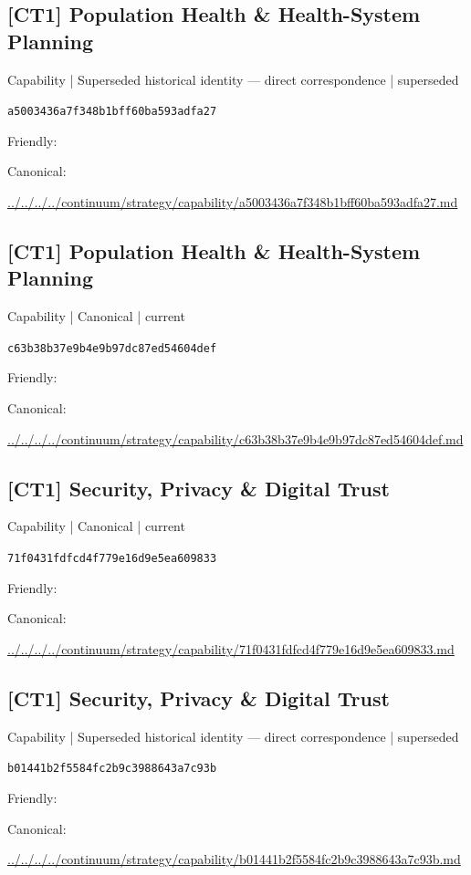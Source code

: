 \documentclass[10pt,a4paper]{article}
\begin{document}
\subsection*{[CT1] Population Health \& Health-System Planning}
{\small Capability | Superseded historical identity — direct correspondence | superseded}\par
\texttt{a5003436a7f348b1bff60ba593adfa27}\par
Friendly: \par
Canonical: \par
{\footnotesize\url{../../../../continuum/strategy/capability/a5003436a7f348b1bff60ba593adfa27.md}}\par
\subsection*{[CT1] Population Health \& Health-System Planning}
{\small Capability | Canonical | current}\par
\texttt{c63b38b37e9b4e9b97dc87ed54604def}\par
Friendly: \par
Canonical: \par
{\footnotesize\url{../../../../continuum/strategy/capability/c63b38b37e9b4e9b97dc87ed54604def.md}}\par
\subsection*{[CT1] Security, Privacy \& Digital Trust}
{\small Capability | Canonical | current}\par
\texttt{71f0431fdfcd4f779e16d9e5ea609833}\par
Friendly: \par
Canonical: \par
{\footnotesize\url{../../../../continuum/strategy/capability/71f0431fdfcd4f779e16d9e5ea609833.md}}\par
\subsection*{[CT1] Security, Privacy \& Digital Trust}
{\small Capability | Superseded historical identity — direct correspondence | superseded}\par
\texttt{b01441b2f5584fc2b9c3988643a7c93b}\par
Friendly: \par
Canonical: \par
{\footnotesize\url{../../../../continuum/strategy/capability/b01441b2f5584fc2b9c3988643a7c93b.md}}\par
\end{document}
